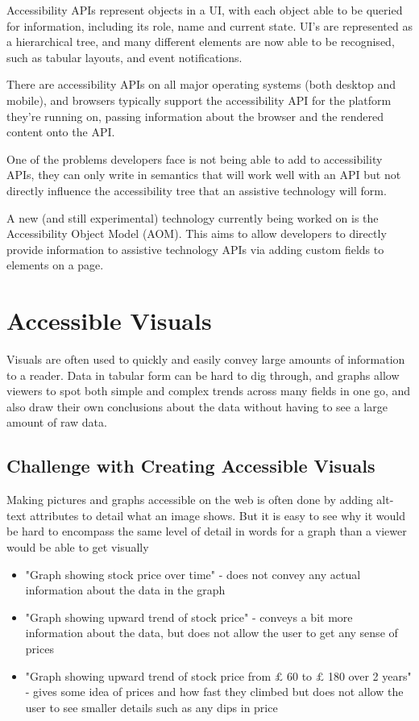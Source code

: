 \documentclass[ %
                    author={Aleena Baig},
                supervisor={Dr Simon Lock},
                    degree={BSc},
                     title={On Making Web Accessible Graphs},
                  subtitle={},
                      year={2019} ]{dissertation}
\begin{document}
Accessibility APIs represent objects in a UI, with each object able to be queried for information, including its role, name and current state. UI's are represented as a hierarchical tree, and many different elements are now able to be recognised, such as tabular layouts, and event notifications.

There are accessibility APIs on all major operating systems (both desktop and mobile), and browsers typically support the accessibility API for the platform they're running on, passing information about the browser and the rendered content onto the API.

One of the problems developers face is not being able to add to accessibility APIs, they can only write in semantics that will work well with an API but not directly influence the accessibility tree that an assistive technology will form.

A new (and still experimental) technology currently being worked on is the Accessibility Object Model (AOM). This aims to allow developers to directly provide information to assistive technology APIs via adding custom fields to elements on a page.

\section{Accessible Visuals}

Visuals are often used to quickly and easily convey large amounts of information to a reader. Data in tabular form can be hard to dig through, and graphs allow viewers to spot both simple and complex trends across many fields in one go, and also draw their own conclusions about the data without having to see a large amount of raw data.


\subsection{Challenge with Creating Accessible Visuals}

Making pictures and graphs accessible on the web is often done by adding alt-text attributes to detail what an image shows. But it is easy to see why it would be hard to encompass the same level of detail in words for a graph than a viewer would be able to get visually

\begin{itemize}
    \item "Graph showing stock price over time" - does not convey any actual information about the data in the graph
    \item "Graph showing upward trend of stock price" - conveys a bit more information about the data, but does not allow the user to get any sense of prices
    \item "Graph showing upward trend of stock price from $\pounds$ 60 to $\pounds$ 180 over 2 years" - gives some idea of prices and how fast they climbed but does not allow the user to see smaller details such as any dips in price
\end{itemize}
\end{document}
